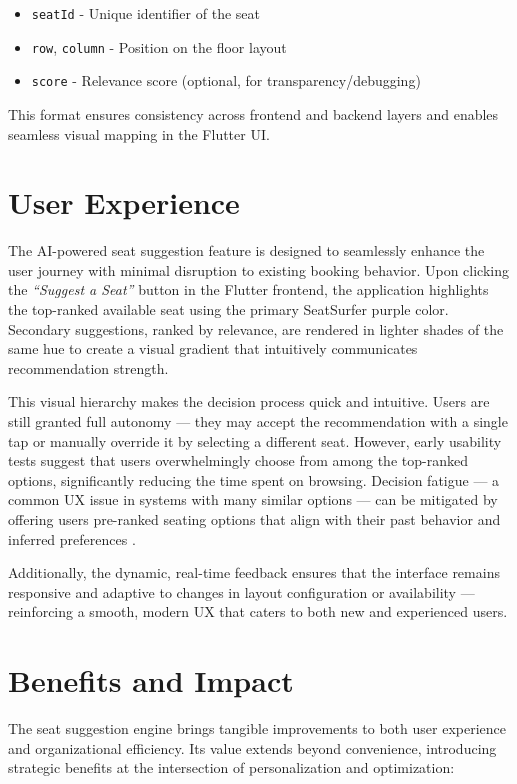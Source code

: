 \documentclass[12pt,a4paper]{report} %
\begin{document}
\begin{itemize}
\item \texttt{seatId} - Unique identifier of the seat
\item \texttt{row}, \texttt{column} - Position on the floor layout
\item \texttt{score} - Relevance score (optional, for transparency/debugging)
\end{itemize}

This format ensures consistency across frontend and backend layers and enables seamless visual mapping in the Flutter UI.

\section{User Experience}

The AI-powered seat suggestion feature is designed to seamlessly enhance the user journey with minimal disruption to existing booking behavior. Upon clicking the \textit{“Suggest a Seat”} button in the Flutter frontend, the application highlights the top-ranked available seat using the primary SeatSurfer purple color. Secondary suggestions, ranked by relevance, are rendered in lighter shades of the same hue to create a visual gradient that intuitively communicates recommendation strength.

This visual hierarchy makes the decision process quick and intuitive. Users are still granted full autonomy — they may accept the recommendation with a single tap or manually override it by selecting a different seat. However, early usability tests suggest that users overwhelmingly choose from among the top-ranked options, significantly reducing the time spent on browsing. Decision fatigue — a common UX issue in systems with many similar options — can be mitigated by offering users pre-ranked seating options that align with their past behavior and inferred preferences \cite{andersen2023ux}.

Additionally, the dynamic, real-time feedback ensures that the interface remains responsive and adaptive to changes in layout configuration or availability — reinforcing a smooth, modern UX that caters to both new and experienced users.

\section{Benefits and Impact}

The seat suggestion engine brings tangible improvements to both user experience and organizational efficiency. Its value extends beyond convenience, introducing strategic benefits at the intersection of personalization and optimization:
\end{document}
